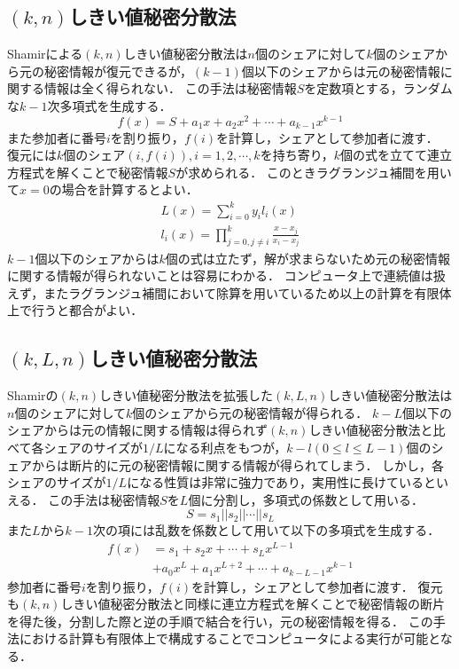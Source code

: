\documentclass[twocolumn]{jarticle}
\begin{document}
\subsection{$(k,n)$しきい値秘密分散法\cite{shamir}}
Shamirによる$(k,n)$しきい値秘密分散法は$n$個のシェアに対して$k$個のシェアから元の秘密情報が復元できるが，$(k-1)$個以下のシェアからは元の秘密情報に関する情報は全く得られない．
%
この手法は秘密情報$S$を定数項とする，ランダムな$k-1$次多項式を生成する．
%
\begin{equation}
	f(x)=S+a_{1}x+a_{2}x^{2}+{\cdots}+a_{k-1}x^{k-1}
\end{equation}
%
また参加者に番号$i$を割り振り，$f(i)$を計算し，シェアとして参加者に渡す．
%
復元には$k$個のシェア$(i,f(i)),i=1,2,\cdots,k$を持ち寄り，$k$個の式を立てて連立方程式を解くことで秘密情報$S$が求められる．
%
このときラグランジュ補間を用いて$x=0$の場合を計算するとよい．
%
\begin{align}
	L(x)={\sum_{i=0}^{k}{y_{i}l_{i}(x)}} \\
	l_{i}(x)={\prod_{j=0,j{\neq}i}^{k}{\frac{x-x_{j}}{x_{i}-x_{j}}}}
\end{align}
%
$k-1$個以下のシェアからは$k$個の式は立たず，解が求まらないため元の秘密情報に関する情報が得られないことは容易にわかる．
%
コンピュータ上で連続値は扱えず，またラグランジュ補間において除算を用いているため以上の計算を有限体上で行うと都合がよい．

\subsection{$(k,L,n)$しきい値秘密分散法\cite{yamamoto}\cite{multiparty}}
Shamirの$(k,n)$しきい値秘密分散法を拡張した$(k,L,n)しきい値秘密分散法$は$n$個のシェアに対して$k$個のシェアから元の秘密情報が得られる．
%
$k-L$個以下のシェアからは元の情報に関する情報は得られず$(k,n)$しきい値秘密分散法と比べて各シェアのサイズが$1/L$になる利点をもつが，$k-l(0{\leq}l{\leq}L-1)$個のシェアからは断片的に元の秘密情報に関する情報が得られてしまう．
%
しかし，各シェアのサイズが$1/L$になる性質は非常に強力であり，実用性に長けているといえる．
%
この手法は秘密情報$S$を$L$個に分割し，多項式の係数として用いる．
%
\begin{equation}
	S=s_{1}||s_{2}||{\cdots}||s_{L}
\end{equation}
%
また$L$から$k-1$次の項には乱数を係数として用いて以下の多項式を生成する．
%
\begin{equation}
	\begin{split}
		f(x)&=s_{1}+s_{2}x+{\cdots}+s_{L}x^{L-1} \\
		&+a_{0}x^{L}+a_{1}x^{L+2}+{\cdots}+a_{k-L-1}x^{k-1}
	\end{split}
\end{equation}
%
参加者に番号$i$を割り振り，$f(i)$を計算し，シェアとして参加者に渡す．
%
復元も$(k,n)$しきい値秘密分散法と同様に連立方程式を解くことで秘密情報の断片を得た後，分割した際と逆の手順で結合を行い，元の秘密情報を得る．
%
この手法における計算も有限体上で構成することでコンピュータによる実行が可能となる．
\end{document}
